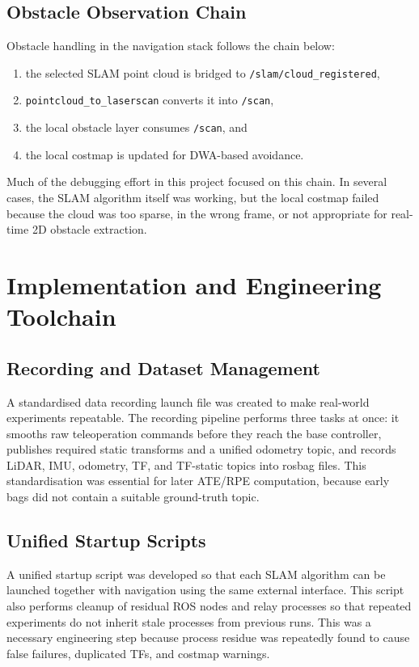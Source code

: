 \documentclass[12pt,a4paper]{report}
\begin{document}
\section{Obstacle Observation Chain}
Obstacle handling in the navigation stack follows the chain below:
\begin{enumerate}[leftmargin=2em]
    \item the selected SLAM point cloud is bridged to \texttt{/slam/cloud\_registered},
    \item \texttt{pointcloud\_to\_laserscan} converts it into \texttt{/scan},
    \item the local obstacle layer consumes \texttt{/scan}, and
    \item the local costmap is updated for DWA-based avoidance.
\end{enumerate}

Much of the debugging effort in this project focused on this chain. In several cases, the SLAM algorithm itself was working, but the local costmap failed because the cloud was too sparse, in the wrong frame, or not appropriate for real-time 2D obstacle extraction.

\chapter{Implementation and Engineering Toolchain}

\section{Recording and Dataset Management}
A standardised data recording launch file was created to make real-world experiments repeatable. The recording pipeline performs three tasks at once: it smooths raw teleoperation commands before they reach the base controller, publishes required static transforms and a unified odometry topic, and records LiDAR, IMU, odometry, TF, and TF-static topics into rosbag files. This standardisation was essential for later ATE/RPE computation, because early bags did not contain a suitable ground-truth topic.

\section{Unified Startup Scripts}
A unified startup script was developed so that each SLAM algorithm can be launched together with navigation using the same external interface. This script also performs cleanup of residual ROS nodes and relay processes so that repeated experiments do not inherit stale processes from previous runs. This was a necessary engineering step because process residue was repeatedly found to cause false failures, duplicated TFs, and costmap warnings.
\end{document}
